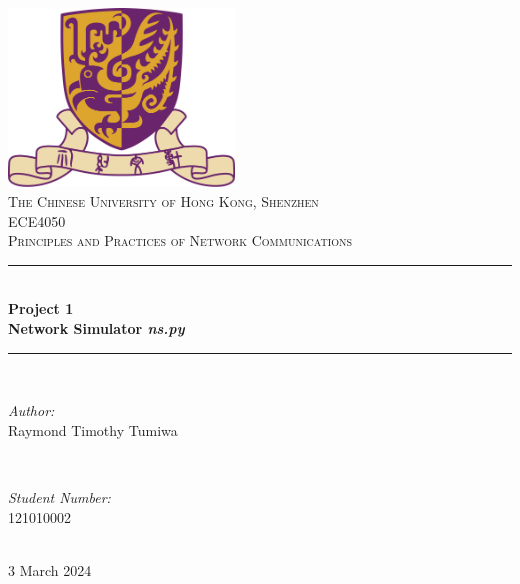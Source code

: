 \documentclass[12pt,a4paper]{report}
\begin{document}


\begin{titlepage}
 \centering
    \includegraphics[scale = 0.75,width=6cm]{CUHK}\\[1.0 cm] %
    \textsc{\large The Chinese University of Hong Kong, Shenzhen}\\[2.0 cm] 
    \textsc{\Large ECE4050}\\[0.5 cm] %
    \textsc{\large Principles and Practices of Network Communications}\\[0.5 cm] %
    \rule{\linewidth}{0.2 mm} \\[0.5 cm]
    {\Large \textbf{Project 1 \\ Network Simulator \textit{\textbf{ns.py}} }}\\[0.5cm]
    \rule{\linewidth}{0.2 mm} \\[1.5 cm]
    
    \begin{minipage}{0.4\textwidth}
        \begin{flushleft} \large
            \emph{Author:}\\
            {Raymond Timothy Tumiwa}
            \end{flushleft}
    \end{minipage}~
    \begin{minipage}{0.4\textwidth}
            \begin{flushright} \large
            \emph{Student Number:} \\
            121010002  %
        \end{flushright}
    \end{minipage}\\[0.5cm]
    
    {\large{3 March 2024}}\\[2 cm]
 
    \vfill
\end{titlepage}
\end{document}
